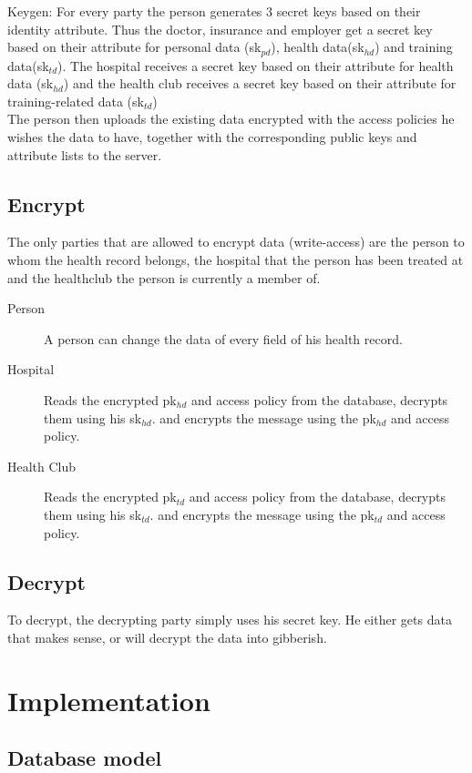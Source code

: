 \documentclass[a4paper]{article}
\begin{document}
    Keygen:
    For every party the person generates 3 secret keys based on their identity attribute. Thus the doctor, insurance and employer get a secret key based on their attribute for personal data (sk$_{pd}$), health data(sk$_{hd}$) and training data(sk$_{td}$). The hospital receives a secret key based on their attribute for health data (sk$_{hd}$) and the health club receives a secret key based on their attribute for training-related data (sk$_{td}$)\\
    The person then uploads the existing data encrypted with the access policies he wishes the data to have, together with the corresponding public keys and attribute lists to the server.
    
    \subsection{Encrypt}
    
    The only parties that are allowed to encrypt data (write-access) are the person to whom the health record belongs, the hospital that the person has been treated at and the healthclub the person is currently a member of. 
    
    \begin{description}
	    \item[Person] A person can change the data of every field of his health record.
    	\item[Hospital] Reads the encrypted pk$_{hd}$ and access policy from the database, decrypts them using his sk$_{hd}$. and encrypts the message using the pk$_{hd}$ and access policy.
	    \item[Health Club] Reads the encrypted pk$_{td}$ and access policy from the database, decrypts them using his sk$_{td}$. and encrypts the message using the pk$_{td}$ and access policy.
    \end{description}
    
    \subsection{Decrypt}
    To decrypt, the decrypting party simply uses his secret key. He either gets data that makes sense, or will decrypt the data into gibberish.
    
\section{Implementation}
	

	\subsection{Database model}
	
\end{document}
